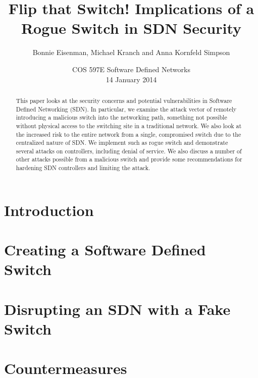 \documentclass[11pt, letterpaper, twocolumn, twoside]{article}
\title{Flip that Switch! Implications of a Rogue Switch in SDN Security}
\author{Bonnie Eisenman, Michael Kranch and Anna Kornfeld Simpson}
\date{COS 597E Software Defined Networks \\ 14 January 2014}
\begin{document}
\maketitle

\begin{spacing}{1.0}

\begin{abstract}
This paper looks at the security concerns and potential vulnerabilities in Software Defined Networking (SDN). In particular, we examine the attack vector of remotely introducing a malicious switch into the networking path, something not possible without physical access to the switching site in a traditional network. We also look at the increased risk to the entire network from a single, compromised switch due to the centralized nature of SDN. We implement such as rogue switch and demonstrate several attacks on controllers, including denial of service. We also discuss a number of other attacks possible from a malicious switch and provide some recommendations for hardening SDN controllers and limiting the attack.

\end{abstract}

\section{Introduction}


\section{Creating a Software Defined Switch}
\label{fake}


\section{Disrupting an SDN with a Fake Switch}
\label{attacks}


\section{Countermeasures}
\label{countermeasures}



\end{spacing}
\end{document}
